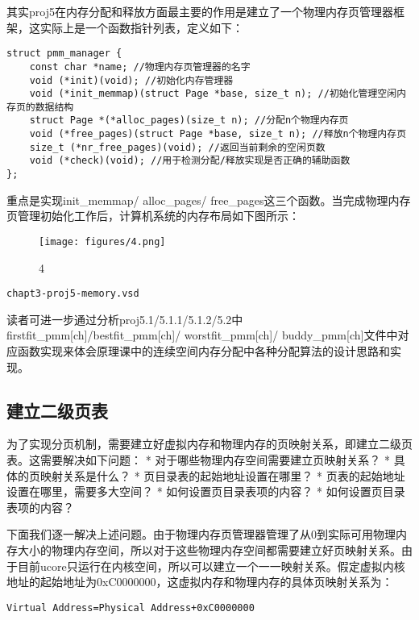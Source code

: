 其实proj5在内存分配和释放方面最主要的作用是建立了一个物理内存页管理器框架，这实际上是一个函数指针列表，定义如下：

\begin{lstlisting}
struct pmm_manager {
    const char *name; //物理内存页管理器的名字
    void (*init)(void); //初始化内存管理器
    void (*init_memmap)(struct Page *base, size_t n); //初始化管理空闲内存页的数据结构
    struct Page *(*alloc_pages)(size_t n); //分配n个物理内存页
    void (*free_pages)(struct Page *base, size_t n); //释放n个物理内存页
    size_t (*nr_free_pages)(void); //返回当前剩余的空闲页数
    void (*check)(void); //用于检测分配/释放实现是否正确的辅助函数
};
\end{lstlisting}

重点是实现init\_memmap/ alloc\_pages/
free\_pages这三个函数。当完成物理内存页管理初始化工作后，计算机系统的内存布局如下图所示：

\begin{figure}[htbp]
\centering
\texttt{[image: figures/4.png]}
\caption{4}
\end{figure}

\lstinline!chapt3-proj5-memory.vsd!

读者可进一步通过分析proj5.1/5.1.1/5.1.2/5.2中firstfit\_pmm{[}ch{]}/bestfit\_pmm{[}ch{]}/
worstfit\_pmm{[}ch{]}/
buddy\_pmm{[}ch{]}文件中对应函数实现来体会原理课中的连续空间内存分配中各种分配算法的设计思路和实现。

\subsection{建立二级页表}\label{ux5efaux7acbux4e8cux7ea7ux9875ux8868}

为了实现分页机制，需要建立好虚拟内存和物理内存的页映射关系，即建立二级页表。这需要解决如下问题：
* 对于哪些物理内存空间需要建立页映射关系？ * 具体的页映射关系是什么？ *
页目录表的起始地址设置在哪里？ *
页表的起始地址设置在哪里，需要多大空间？ * 如何设置页目录表项的内容？ *
如何设置页目录表项的内容？

下面我们逐一解决上述问题。由于物理内存页管理器管理了从0到实际可用物理内存大小的物理内存空间，所以对于这些物理内存空间都需要建立好页映射关系。由于目前ucore只运行在内核空间，所以可以建立一个一一映射关系。假定虚拟内核地址的起始地址为0xC0000000，这虚拟内存和物理内存的具体页映射关系为：

\begin{lstlisting}
Virtual Address=Physical Address+0xC0000000 
\end{lstlisting}

